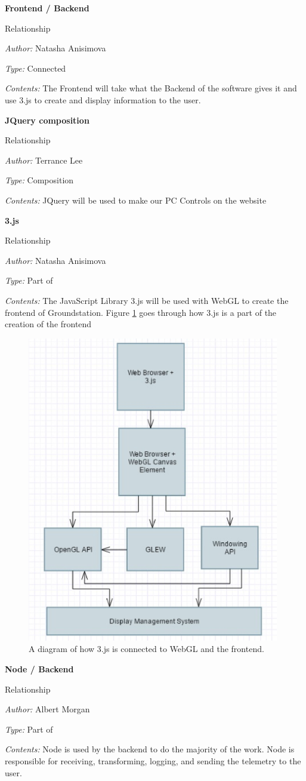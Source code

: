 \documentclass[10pt,draftclsnofoot,onecolumn]{IEEEtran}
\newcommand{\newrelationship}[4]{
	\noindent\textbf{#2}
	
	\noindent Relationship
	
	\noindent\textit{Author:} #1

	\noindent\textit{Type:} #3

	\noindent\textit{Contents:} #4

	\vspace{.5cm}
}
\begin{document}
	\newrelationship
	{Natasha Anisimova}
	{Frontend / Backend}
	{Connected}
	{The Frontend will take what the Backend of the software gives it and use 3.js to create and display information to the user.}
	
	\newrelationship
	{Terrance Lee}
	{JQuery composition}
	{Composition}
	{JQuery will be used to make our PC Controls on the website}
	
	\newrelationship
	{Natasha Anisimova}
	{3.js}
	{Part of}
	{The JavaScript Library 3.js will be used with WebGL to create the frontend of Groundstation. Figure \ref{fig:4} goes through how 3.js is a part of the creation of the frontend}
	
	\begin{center}
	\begin{figure}[htbp!]
			\centering\includegraphics[width=110mm]{RelationshipDiagram.eps}
			\caption{A diagram of how 3.js is connected to WebGL and the frontend.}
			\label{fig:4}
	\end{figure}
	\end{center}
	\clearpage
	\newrelationship
	{Albert Morgan}
	{Node / Backend}
	{Part of}
	{	Node is used by the backend to do the majority of the work.
		Node is responsible for receiving, transforming, logging, and sending the telemetry to the user.
	}
	
\end{document}
